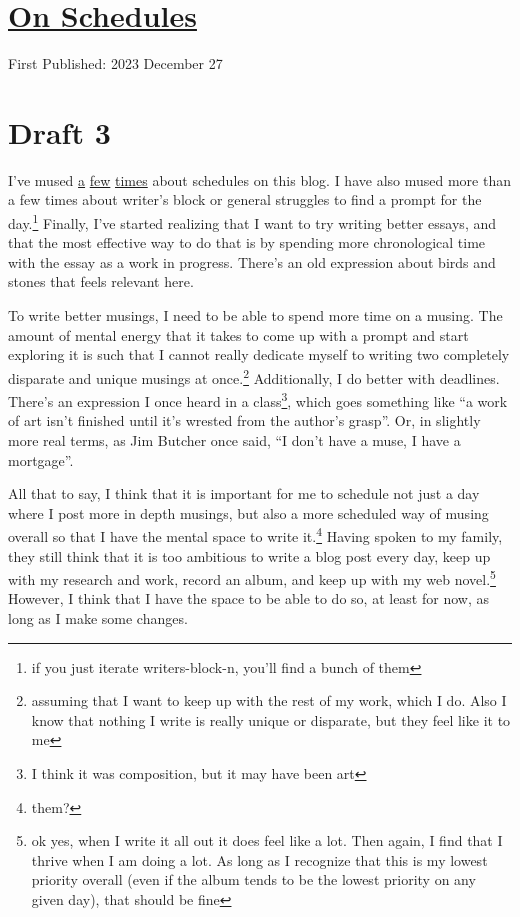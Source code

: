 \documentclass[12pt]{article}[titlepage]
\newcommand{\say}[1]{``#1''}
\renewcommand{\,}{\textsuperscript{,}}
\begin{document}
\doublespacing
\section{\href{schedules-3.html}{On Schedules}}
First Published: 2023 December 27

\section{Draft 3}
I've mused \href{schedules.html}{a} \href{meta-schedules.html}{few} \href{schedules-2.html}{times} about schedules on this blog.
I have also mused more than a few times about writer's block or general struggles to find a prompt for the day.\footnote{if you just iterate writers-block-n, you'll find a bunch of them}
Finally, I've started realizing that I want to try writing better essays, and that the most effective way to do that is by spending more chronological time with the essay as a work in progress.
There's an old expression about birds and stones that feels relevant here.

To write better musings, I need to be able to spend more time on a musing.
The amount of mental energy that it takes to come up with a prompt and start exploring it is such that I cannot really dedicate myself to writing two completely disparate and unique musings at once.\footnote{assuming that I want to keep up with the rest of my work, which I do. Also I know that nothing I write is really unique or disparate, but they feel like it to me}
Additionally, I do better with deadlines.
There's an expression I once heard in a class\footnote{I think it was composition, but it may have been art}, which goes something like \say{a work of art isn't finished until it's wrested from the author's grasp}.
Or, in slightly more real terms, as Jim Butcher once said, \say{I don't have a muse, I have a mortgage}.

All that to say, I think that it is important for me to schedule not just a day where I post more in depth musings, but also a more scheduled way of musing overall so that I have the mental space to write it.\footnote{them?}
Having spoken to my family, they still think that it is too ambitious to write a blog post every day, keep up with my research and work, record an album, and keep up with my web novel.\footnote{ok yes, when I write it all out it does feel like a lot. Then again, I find that I thrive when I am doing a lot. As long as I recognize that this is my lowest priority overall (even if the album tends to be the lowest priority on any given day), that should be fine}
However, I think that I have the space to be able to do so, at least for now, as long as I make some changes.
\end{document}
